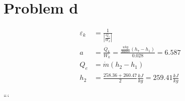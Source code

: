 \section*{Problem d}

\begin{align*}
\varepsilon_k &= \frac{1}{\left| \frac{Q_{e}}{W_{k}} \right|} \\
a &= \frac{\dot{Q_k}}{W_k} = \frac{\frac{u k g}{3600 s} (h_7 - h_1)}{0.028} = 6.587 \\
Q_{e} &= \dot{m} (h_2 - h_1) \\
h_2 &= \frac{258.36 + 260.47}{2} \frac{kJ}{kg} = 259.41 \frac{kJ}{kg}
\end{align*}

```